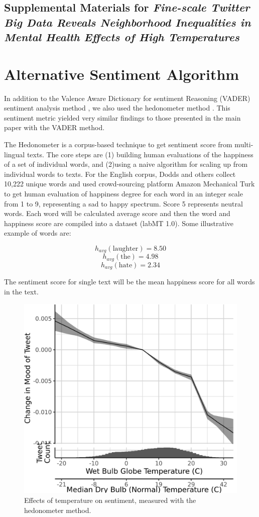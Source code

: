 \documentclass{article}
\begin{document}
\begin{center}
\section*{Supplemental Materials for \textit{Fine-scale Twitter Big Data Reveals Neighborhood Inequalities in Mental Health Effects of High Temperatures}}
\end{center}

\setcounter{table}{0}
\setcounter{figure}{0}
\setcounter{section}{0}
\renewcommand{\thetable}{S\arabic{table}}
\renewcommand{\thefigure}{S\arabic{figure}}
\renewcommand{\thesection}{S\arabic{section}}

\section{Alternative Sentiment Algorithm}

In addition to the Valence Aware Dictionary for sentiment Reasoning (VADER) sentiment analysis method \cite{gilbert_vader_2014}, we also used the hedonometer method \cite{Dodds2011Dec}.  This sentiment metric yielded very similar findings to those presented in the main paper with the VADER method.

The Hedonometer \cite{dodds_temporal_2011} is a corpus-based technique to get sentiment score from multi-lingual texts. The core steps are (1) building human evaluations of the happiness of a set of individual words, and (2)using a naive algorithm for scaling up from individual words to texts. For the English corpus, Dodds and others \cite{dodds_temporal_2011} collect 10,222 unique words and used crowd-sourcing platform Amazon Mechanical Turk to get human evaluation of happiness degree for each word in an integer scale from 1 to 9, representing a sad to happy spectrum. Score 5 represents neutral words. Each word will be calculated average score and then the word and happiness score are compiled into a dataset (labMT 1.0). Some illustrative example of words are: 

\[h_{avg} (\text{laughter}) = 8.50 \]
\[h_{avg} (\text{the}) = 4.98\]
\[h_{avg} (\text{hate}) = 2.34\]

The sentiment score for single text will be the mean happiness score for all words in the text.

\begin{figure}[H]
  \centering
  \includegraphics[width=0.6\linewidth]{../res/hedono-wbgt.png}
  \caption{Effects of temperature on sentiment, measured with the hedonometer method.}
\end{figure}
\end{document}
